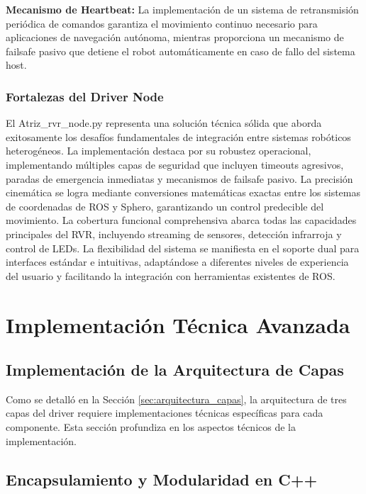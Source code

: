 \documentclass[11pt]{article}
\newcommand{\code}[1]{\textcolor{codeblue}{\url{#1}}}
\numberwithin{figure}{section}
\numberwithin{table}{section}
\def\code#1{#1}%
\begin{document}
\textbf{Mecanismo de Heartbeat:} La implementación de un sistema de retransmisión periódica de comandos garantiza el movimiento continuo necesario para aplicaciones de navegación autónoma, mientras proporciona un mecanismo de failsafe pasivo que detiene el robot automáticamente en caso de fallo del sistema host.


\subsubsection{Fortalezas del Driver Node}

El \code{Atriz\_rvr\_node.py} representa una solución técnica sólida que aborda exitosamente los desafíos fundamentales de integración entre sistemas robóticos heterogéneos. La implementación destaca por su robustez operacional, implementando múltiples capas de seguridad que incluyen timeouts agresivos, paradas de emergencia inmediatas y mecanismos de failsafe pasivo. La precisión cinemática se logra mediante conversiones matemáticas exactas entre los sistemas de coordenadas de ROS y Sphero, garantizando un control predecible del movimiento. La cobertura funcional comprehensiva abarca todas las capacidades principales del RVR, incluyendo streaming de sensores, detección infrarroja y control de LEDs. La flexibilidad del sistema se manifiesta en el soporte dual para interfaces estándar e intuitivas, adaptándose a diferentes niveles de experiencia del usuario y facilitando la integración con herramientas existentes de ROS.


\newpage


\section{Implementación Técnica Avanzada}
\label{sec:implementacion_tecnica}


\subsection{Implementación de la Arquitectura de Capas}

Como se detalló en la Sección \ref{sec:arquitectura_capas}, la arquitectura de tres capas del driver requiere implementaciones técnicas específicas para cada componente. Esta sección profundiza en los aspectos técnicos de la implementación.


\subsection{Encapsulamiento y Modularidad en C++}
\end{document}
